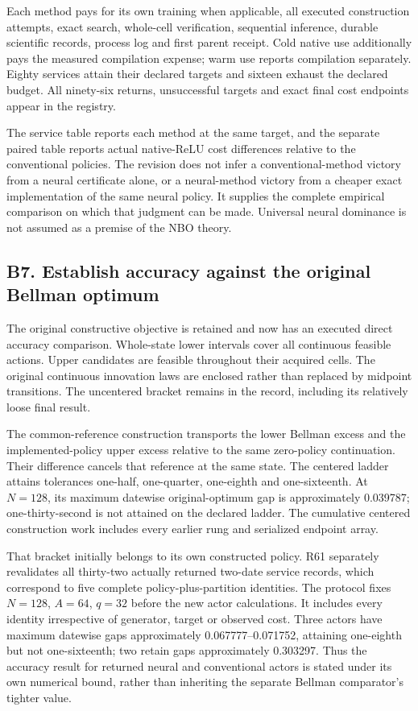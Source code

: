 Each method pays for its own training when applicable, all executed
construction attempts, exact search, whole-cell verification, sequential
inference, durable scientific records, process log and first parent
receipt. Cold native use additionally pays the measured compilation
expense; warm use reports compilation separately. Eighty services attain
their declared targets and sixteen exhaust the declared budget. All
ninety-six returns, unsuccessful targets and exact final cost endpoints
appear in the registry.

The service table reports each method at the same target, and the
separate paired table reports actual native-ReLU cost differences
relative to the conventional policies. The revision does not infer a
conventional-method victory from a neural certificate alone, or a
neural-method victory from a cheaper exact implementation of the same
neural policy. It supplies the complete empirical comparison on which
that judgment can be made. Universal neural dominance is not assumed as
a premise of the NBO theory.

\hypertarget{b7.-establish-accuracy-against-the-original-bellman-optimum}{%
\subsection{B7. Establish accuracy against the original Bellman
optimum}\label{b7.-establish-accuracy-against-the-original-bellman-optimum}}

The original constructive objective is retained and now has an executed
direct accuracy comparison. Whole-state lower intervals cover all
continuous feasible actions. Upper candidates are feasible throughout
their acquired cells. The original continuous innovation laws are
enclosed rather than replaced by midpoint transitions. The uncentered
bracket remains in the record, including its relatively loose final
result.

The common-reference construction transports the lower Bellman excess
and the implemented-policy upper excess relative to the same zero-policy
continuation. Their difference cancels that reference at the same state.
The centered ladder attains tolerances one-half, one-quarter, one-eighth
and one-sixteenth. At \(N=128\), its maximum datewise original-optimum
gap is approximately 0.039787; one-thirty-second is not attained on the
declared ladder. The cumulative centered construction work includes
every earlier rung and serialized endpoint array.

That bracket initially belongs to its own constructed policy. R61
separately revalidates all thirty-two actually returned two-date service
records, which correspond to five complete policy-plus-partition
identities. The protocol fixes \(N=128\), \(A=64\), \(q=32\) before the
new actor calculations. It includes every identity irrespective of
generator, target or observed cost. Three actors have maximum datewise
gaps approximately 0.067777--0.071752, attaining one-eighth but not
one-sixteenth; two retain gaps approximately 0.303297. Thus the accuracy
result for returned neural and conventional actors is stated under its
own numerical bound, rather than inheriting the separate Bellman
comparator's tighter value.

